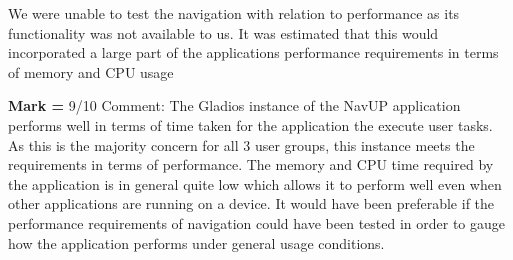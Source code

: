 \documentclass{article}
\begin{document}
		 	\cleardoublepage
		
		We were unable to test the navigation with relation to performance as its functionality was not available to us. It was estimated that this would incorporated a large part of the applications performance requirements in terms of memory and CPU usage \newline
		
		\textbf{Mark =} 9/10 \newline
		Comment: The Gladios instance of the NavUP application performs well in terms of time taken for the application the execute user tasks. As this is the majority concern for all 3 user groups, this instance meets the requirements in terms of performance. The memory and CPU time required by the application is in general quite low which allows it to perform well even when other applications are running on a device. It would have been preferable if the performance requirements of navigation could have been tested in order to gauge how the application performs under general usage conditions.
\end{document}
